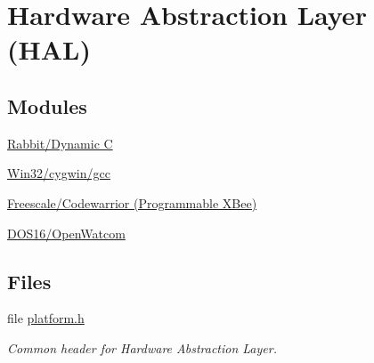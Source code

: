\hypertarget{group__hal}{\section{Hardware Abstraction Layer (H\-A\-L)}
\label{group__hal}
}
\subsection*{Modules}
\begin{DoxyCompactItemize}
\item 
\hyperlink{group__hal__rabbit}{Rabbit/\-Dynamic C}
\item 
\hyperlink{group__hal__win32}{Win32/cygwin/gcc}
\item 
\hyperlink{group__hal__freescale}{Freescale/\-Codewarrior (\-Programmable X\-Bee)}
\item 
\hyperlink{group__hal__dos}{D\-O\-S16/\-Open\-Watcom}
\end{DoxyCompactItemize}
\subsection*{Files}
\begin{DoxyCompactItemize}
\item 
file \hyperlink{platform_8h}{platform.\-h}
\begin{DoxyCompactList}\small\item\em Common header for Hardware Abstraction Layer. \end{DoxyCompactList}\end{DoxyCompactItemize}
